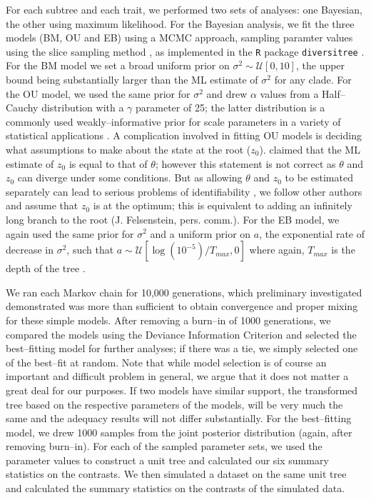 \documentclass[a4paper,12pt]{article}
\begin{document}
For each subtree and each trait, we performed two sets of analyses: one Bayesian, the other using maximum likelihood. For the Bayesian analysis, we fit the three models (BM, OU and EB) using a MCMC approach, sampling paramter values using the slice sampling method \citep{Nealslice}, as implemented in the \texttt{R} package \texttt{diversitree} \citep{FitzJohn2012}. For the BM model we set a broad uniform prior on $\sigma^2 \sim \mathcal{U}[0, 10]$, the upper bound being substantially larger than the ML estimate of $\sigma^2$ for any clade. For the OU model, we used the same prior for $\sigma^2$ and drew $\alpha$ values from a Half--Cauchy distribution with a $\gamma$ parameter of 25; the latter distribution is a commonly used weakly--informative prior for scale parameters in a variety of statistical applications \citep[see][]{Gelmanprior, Polson2012}. A complication involved in fitting OU models is deciding what assumptions to make about the state at the root ($z_0$). \citet{Harmon2010} claimed that the ML estimate of $z_0$ is equal to that of $\theta$; however this statement is not correct as $\theta$ and $z_0$ can diverge under some conditions. But as allowing $\theta$ and $z_0$ to be estimated separately can lead to serious problems of identifiability \citep{HoAne2012}, we follow other authors \citep[e.g.][]{Labra2009, Beaulieu2012} and assume that $z_0$ is at the optimum; this is equivalent to adding an infinitely long branch to the root (J. Felsenstein, pers. comm.). For the EB model, we again used the same prior for $\sigma^2$ and a uniform prior on $a$, the exponential rate of decrease in $\sigma^2$, such that $a \sim \mathcal{U}[\log (10^{-5})/T_{max}, 0]$ where again, $T_{max}$ is the depth of the tree \citep[for rationale, see][]{SlaterPennell}.

We ran each Markov chain for 10,000 generations, which preliminary investigated demonstrated was more than sufficient to obtain convergence and proper mixing for these simple models. After removing a burn--in of 1000 generations, we compared the models using the Deviance Information Criterion \citep[DIC;][]{dic} and selected the best--fitting model for further analyses; if there was a tie, we simply selected one of the best--fit at random. Note that while model selection is of course an important and difficult problem in general, we argue that it does not matter a great deal for our purposes. If two models have similar support, the transformed tree based on the respective parameters of the models, will be very much the same and the adequacy results will not differ substantially. For the best--fitting model, we drew 1000 samples from the joint posterior distribution (again, after removing burn--in). For each of the sampled parameter sets, we used the parameter values to construct a unit tree and calculated our six summary statistics on the contrasts. We then simulated a dataset on the same unit tree and calculated the summary statistics on the contrasts of the simulated data.
 
\end{document}
